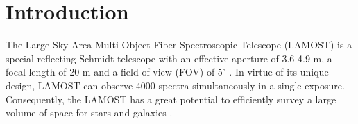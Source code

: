 \documentclass[manuscript]{aastex}
\begin{document}






\section{Introduction}           %
\label{sect:intro}
The Large Sky Area Multi-Object Fiber Spectroscopic Telescope (LAMOST) is a special reflecting Schmidt telescope with an effective aperture of 3.6-4.9 m, a focal length of 20 m and a field of view (FOV) of 5$^\circ$ \citep{cui2012large}.
In virtue of its unique design, LAMOST can  observe  4000 spectra simultaneously in a single exposure.
Consequently, the LAMOST  has a great potential to efficiently survey a large volume of space for stars and galaxies \citep{zhao2012lamost}.
\end{document}
